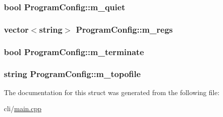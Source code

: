 \hypertarget{struct_program_config_a4649e2d4caee5940e25fa433cef4e87a}{
\subsubsection[{m\+\_\+quiet}]{\setlength{\rightskip}{0pt plus 5cm}bool Program\+Config\+::m\+\_\+quiet}}\label{struct_program_config_a4649e2d4caee5940e25fa433cef4e87a}
\hypertarget{struct_program_config_a88d264b7eb38611c33f6468049058990}{
\subsubsection[{m\+\_\+regs}]{\setlength{\rightskip}{0pt plus 5cm}vector$<$string$>$ Program\+Config\+::m\+\_\+regs}}\label{struct_program_config_a88d264b7eb38611c33f6468049058990}
\hypertarget{struct_program_config_ab47f8c84c95b73b76accfc4e653a9ae5}{
\subsubsection[{m\+\_\+terminate}]{\setlength{\rightskip}{0pt plus 5cm}bool Program\+Config\+::m\+\_\+terminate}}\label{struct_program_config_ab47f8c84c95b73b76accfc4e653a9ae5}
\hypertarget{struct_program_config_a87b9ea2013de37dd8fc569704cd033f6}{
\subsubsection[{m\+\_\+topofile}]{\setlength{\rightskip}{0pt plus 5cm}string Program\+Config\+::m\+\_\+topofile}}\label{struct_program_config_a87b9ea2013de37dd8fc569704cd033f6}


The documentation for this struct was generated from the following file\+:\begin{DoxyCompactItemize}
\item 
cli/\hyperlink{main_8cpp}{main.\+cpp}\end{DoxyCompactItemize}
